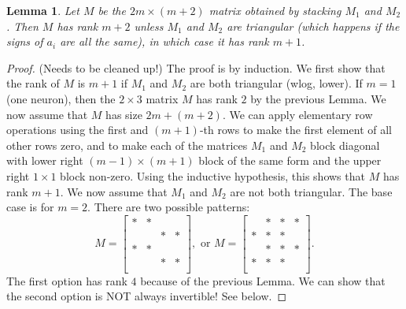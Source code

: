 \documentclass{article}
\newtheorem{lemma}[theorem]{Lemma}
\begin{document}
\begin{lemma} Let $M$ be the $2m \times (m+2)$ matrix obtained by stacking
$M_1$ and $M_2$. Then $M$ has rank $m+2$ unless $M_1$ and $M_2$ are triangular
(which happens if the signs of $a_i$ are all the same), in which case it has
rank $m+1$.
\end{lemma}
\begin{proof}(Needs to be cleaned up!) The proof is by induction. We first
show that the rank of $M$ is $m+1$ if $M_1$ and $M_2$ are both triangular
(wlog, lower). If $m = 1$ (one neuron), then the $2\times 3$ matrix $M$ has
rank $2$ by the previous Lemma. We now assume that $M$ has size $2m + (m+2)$.
We can apply elementary row operations using the first and $(m+1)$-th rows to
make the first element of all other rows zero, and to make each of the
matrices $M_1$ and $M_2$ block diagonal with lower right $(m-1) \times (m+1)$
block of the same form and the upper right $1\times 1$ block non-zero. Using
the inductive hypothesis, this shows that $M$ has rank $m+1$. We now assume
that $M_1$ and $M_2$ are not both triangular. The base case is for $m=2$.
There are two possible patterns:
\begin{equation}
M = \begin{bmatrix} 
* & * &  & \\
  &  & * & *\\
* & * &  & \\
  &  & * & *\\
\end{bmatrix}, \mbox{ or }
M = \begin{bmatrix} 
& * & * & *\\
*  & * & * & \\
& * & * & *\\
*  & * & * & \\
\end{bmatrix}.
\end{equation}
The first option has rank $4$ because of the previous Lemma. We can show that
the second option is NOT always invertible! See below.


\end{proof}
\end{document}
